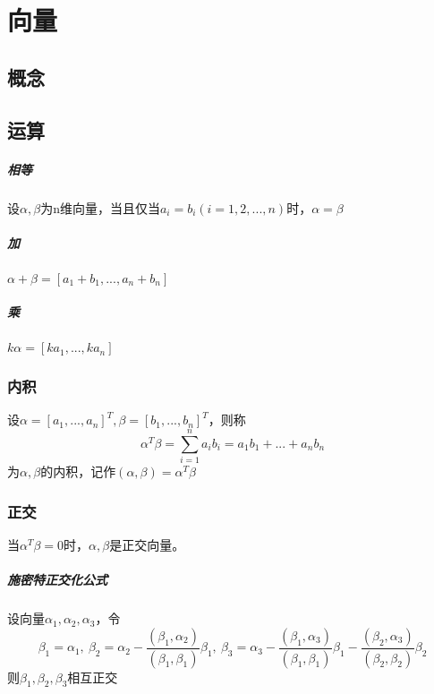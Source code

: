 
\chapter{向量}


\section{概念}

\section{运算}

\paragraph{相等}
设\(\alpha,\beta\)为n维向量，当且仅当\(a_i = b_i(i = 1,2,...,n)\)时，\(\alpha = \beta\)


\paragraph{加}
\(\alpha + \beta = [a_1 + b_1, ..., a_n + b_n]\)


\paragraph{乘}
\(k\alpha = [ka_1, ..., ka_n]\)


\subsection{内积}
设\(\alpha = [a_1, ..., a_n]^T, \beta = [b_1, ..., b_n]^T\)，则称\[\alpha^T\beta = \sum_{i = 1}^{n} a_ib_i = a_1b_1 + ... + a_nb_n\]为\(\alpha, \beta\)的内积，记作\((\alpha, \beta) = \alpha^T\beta\)


\subsection{正交}
当\(\alpha^T\beta = 0\)时，\(\alpha, \beta\)是正交向量。

\paragraph{施密特正交化公式}
设向量\(\alpha_1, \alpha_2, \alpha_3\)，令
\[\beta_1 = \alpha_1,\ \beta_2 = \alpha_2 - \dfrac{(\beta_1, \alpha_2)}{(\beta_1, \beta_1)}\beta_1,\ \beta_3 = \alpha_3 - \dfrac{(\beta_1, \alpha_3)}{(\beta_1, \beta_1)}\beta_1 - \dfrac{(\beta_2, \alpha_3)}{(\beta_2, \beta_2)}\beta_2\]
则\(\beta_1, \beta_2, \beta_3\)相互正交



